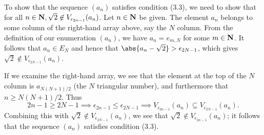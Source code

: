 \documentclass{lew98_solutions}
\begin{document}
\begin{solution}
\begin{enumerate}
        To show that the sequence \( (a_n) \) satisfies condition (3.3), we need to show that for all \( n \in \mathbf{N}, \sqrt{2} \not\in V_{\epsilon_{2n - 1}}(a_n) \). Let \( n \in \mathbf{N} \) be given. The element \( a_n \) belongs to some column of the right-hand array above, say the \( N \) column. From the definition of our enumeration \( (a_n) \), we have \( a_n = e_{m,N} \) for some \( m \in \mathbf{N} \). It follows that \( a_n \in E_N \) and hence that \( \abs{a_n - \sqrt{2}} > \epsilon_{2N - 1} \), which gives \( \sqrt{2} \not\in V_{\epsilon_{2N - 1}}(a_n) \).
        
        If we examine the right-hand array, we see that the element at the top of the \( N \) column is \( a_{N(N+1)/2} \) (the \( N \) triangular number), and furthermore that \( n \geq N(N+1)/2 \). Thus
        \[
            2n - 1 \geq 2N - 1 \implies \epsilon_{2n-1} \leq \epsilon_{2N-1} \implies V_{\epsilon_{2n - 1}}(a_n) \subseteq V_{\epsilon_{2N - 1}}(a_n).
        \]
        Combining this with \( \sqrt{2} \not\in V_{\epsilon_{2N - 1}}(a_n) \), we see that \( \sqrt{2} \not\in V_{\epsilon_{2n - 1}}(a_n) \); it follows that the sequence \( (a_n) \) satisfies condition (3.3).

        \noindent \hrulefill



\end{enumerate}
\end{solution}
\end{document}
